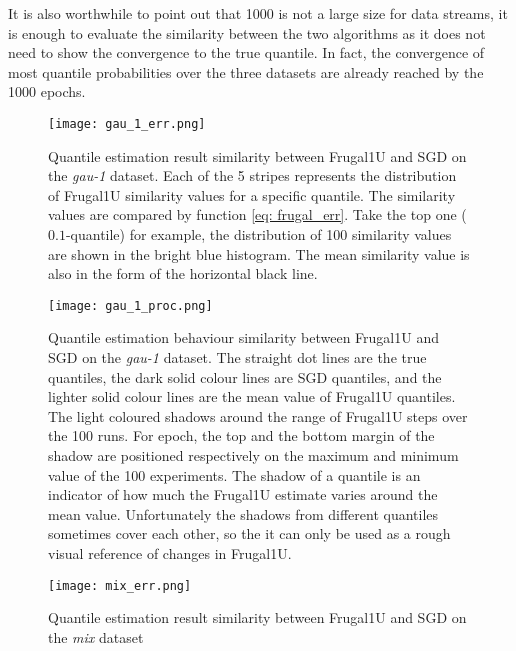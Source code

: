 It is also worthwhile to point out that 1000 is not a large size for data streams, it is enough to evaluate the similarity between the two algorithms as it does not need to show the convergence to the true quantile. In fact, the convergence of most quantile probabilities over the three datasets are already reached by the 1000 epochs.

\begin{figure}[h!]
    \centering
	\texttt{[image: gau\_1\_err.png]}
    \caption{Quantile estimation result similarity between Frugal1U and SGD on the \textit{gau-1} dataset.
    Each of the 5 stripes represents the distribution of Frugal1U similarity values for a specific quantile. The similarity values are compared by function \eqref{eq: frugal_err}. Take the top one ($0.1$-quantile) for example, the distribution of 100 similarity values are shown in the bright blue histogram. The mean similarity value is also in the form of the horizontal black line.}
    \label{fig: gau_1_err}
\end{figure}

\begin{figure}[h!]
    \centering
    \texttt{[image: gau\_1\_proc.png]}
    \caption{Quantile estimation behaviour similarity between Frugal1U and SGD on the \textit{gau-1} dataset. The straight dot lines are the true quantiles, the dark solid colour lines are SGD quantiles, and the lighter solid colour lines are the mean value of Frugal1U quantiles. The light coloured shadows around the range of Frugal1U steps over the 100 runs. For epoch, the top and the bottom margin of the shadow are positioned respectively on the maximum and minimum value of the 100 experiments. The shadow of a quantile is an indicator of how much the Frugal1U estimate varies around the mean value. Unfortunately the shadows from different quantiles sometimes cover each other, so the it can only be used as a rough visual reference of changes in Frugal1U.}
    \label{fig: gau_1_proc}
\end{figure}

\begin{figure}[h!]
    \centering
	\texttt{[image: mix\_err.png]}
    \caption{Quantile estimation result similarity between Frugal1U and SGD on the \textit{mix} dataset}
    \label{fig: mix_err}
\end{figure}

